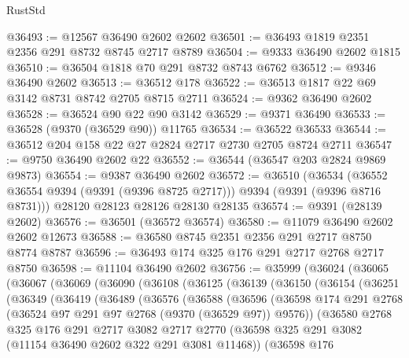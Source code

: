 \begin{lexlean}{RustStd}
\begin{coremodule}
@36493 := @12567 @36490 @2602 @2602
@36501 := @36493 @1819 @2351 @2356 @291 @8732 @8745 @2717 @8789
@36504 := @9333 @36490 @2602 @1815
@36510 := @36504 @1818 @70 @291 @8732 @8743 @6762
@36512 := @9346 @36490 @2602
@36513 := @36512 @178
@36522 := @36513 @1817 @22 @69 @3142 @8731 @8742 @2705 @8715 @2711
@36524 := @9362 @36490 @2602
@36528 := @36524 @90 @22 @90 @3142
@36529 := @9371 @36490
@36533 := @36528 (@9370 (@36529 @90)) @11765
@36534 := @36522 @36533
@36544 := @36512 @204 @158 @22 @27 @2824 @2717 @2730 @2705 @8724 @2711
@36547 := @9750 @36490 @2602 @22
@36552 := @36544 (@36547 @203 @2824 @9869 @9873)
@36554 := @9387 @36490 @2602
@36572 := @36510
    (@36534 (@36552 @36554 @9394 (@9391 (@9396 @8725 @2717))) @9394 (@9391 (@9396 @8716 @8731)))
    @28120
    @28123
    @28126
    @28130
    @28135
@36574 := @9391 (@28139 @2602)
@36576 := @36501 (@36572 @36574)
@36580 := @11079 @36490 @2602 @2602 @12673
@36588 := @36580 @8745 @2351 @2356 @291 @2717 @8750 @8774 @8787
@36596 := @36493 @174 @325 @176 @291 @2717 @2768 @2717 @8750
@36598 := @11104 @36490 @2602
@36756 := @35999
    (@36024
      (@36065
        (@36067
          (@36069
            (@36090
              (@36108
                (@36125
                  (@36139
                    (@36150
                      (@36154
                        (@36251
                          (@36349
                            (@36419
                              (@36489
                                (@36576
                                  (@36588
                                    (@36596
                                      (@36598
                                        @174
                                        @291
                                        @2768
                                        (@36524 @97 @291 @97 @2768 (@9370 (@36529 @97)) @9576))
                                      (@36580
                                        @2768
                                        @325
                                        @176
                                        @291
                                        @2717
                                        @3082
                                        @2717
                                        @2770
                                        (@36598
                                          @325
                                          @291
                                          @3082
                                          (@11154 @36490 @2602 @322 @291 @3081 @11468))
                                        (@36598
                                          @176

\end{coremodule}
\end{lexlean}
